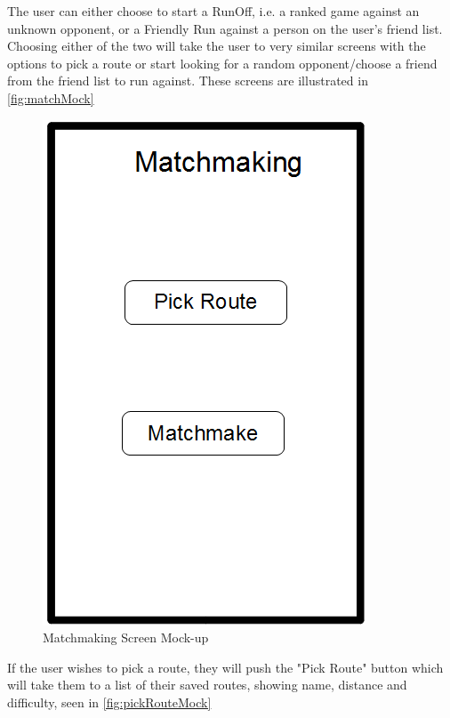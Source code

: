 The user can either choose to start a RunOff, i.e. a ranked game against an unknown opponent, or a Friendly Run against a person on the user's friend list. Choosing either of the two will take the user to very similar screens with the options to pick a route or start looking for a random opponent/choose a friend from the friend list to run against. These screens are illustrated in \autoref{fig:matchMock}

\begin{figure}[ht]
\begin{center}
 \includegraphics[scale=0.4]{img/matchMock.png}
 \caption{Matchmaking Screen Mock-up}
 \label{fig:matchMock}
\end{center}
\end{figure}

If the user wishes to pick a route, they will push the "Pick Route" button which will take them to a list of their saved routes, showing name, distance and difficulty, seen in \autoref{fig:pickRouteMock}


